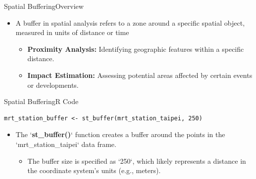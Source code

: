 \documentclass[dvipsnames,hyperref={pdfpagelabels=false}]{beamer}
\begin{document}
\begin{frame}{Spatial Buffering}{Overview}

	
	\begin{itemize}
		\item A buffer in spatial analysis refers to a zone around a specific spatial object, measured in units of distance or time
					\vspace{0.2cm}
			\begin{itemize}
			\item \textbf{Proximity Analysis:} Identifying geographic features within a specific distance.
			\vspace{0.2cm}
			\item \textbf{Impact Estimation:} Assessing potential areas affected by certain events or developments.
			
		\end{itemize}
		
	\end{itemize}
\end{frame}





\begin{frame}[fragile]{Spatial Buffering}{R Code}
\begin{lstlisting}
mrt_station_buffer <- st_buffer(mrt_station_taipei, 250)
\end{lstlisting}
\begin{itemize}
\item The `\textbf{st\_buffer()}` function creates a buffer around the points in the  `mrt\_station\_taipei` data frame.
	\vspace{0.2cm}
	\begin{itemize}
		\item The buffer size is specified as `250`, which likely represents a distance in the coordinate system's units (e.g., meters).
	\end{itemize}
\end{itemize}
\end{frame}
\end{document}

